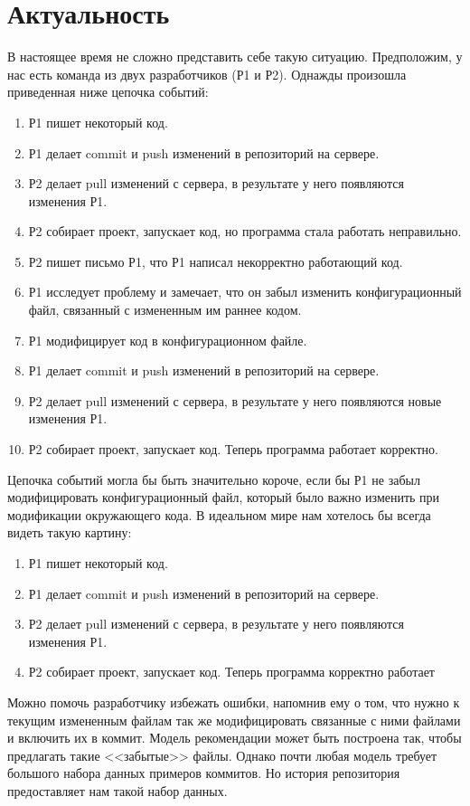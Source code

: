 \documentclass[times]{itmo-student-thesis}
\begin{document}
\section{Актуальность}
В настоящее время не сложно представить себе такую ситуацию. Предположим, у нас есть команда из двух разработчиков (Р1 и Р2). Однажды произошла приведенная ниже цепочка событий:
    \begin{enumerate}
		\item Р1 пишет некоторый код.
		\item Р1 делает commit и push изменений в репозиторий на сервере.
		\item Р2 делает pull изменений с сервера, в результате у него появляются изменения Р1.
		\item Р2 собирает проект, запускает код, но программа стала работать неправильно.
		\item Р2 пишет письмо Р1, что Р1 написал некорректно работающий код. 
		\item Р1 исследует проблему и замечает, что он забыл изменить конфигурационный файл, связанный с измененным им раннее кодом.
		\item Р1 модифицирует код в конфигурационном файле.
		\item Р1 делает commit и push изменений в репозиторий на сервере.
		\item Р2 делает pull изменений с сервера, в результате у него появляются новые изменения Р1.
		\item Р2 собирает проект, запускает код. Теперь программа работает корректно.
	\end{enumerate}
Цепочка событий могла бы быть значительно короче, если бы Р1 не забыл модифицировать конфигурационный файл, который было важно изменить при модификации окружающего кода. В идеальном мире нам хотелось бы всегда видеть такую картину:
    \begin{enumerate}
		\item Р1 пишет некоторый код.
		\item Р1 делает commit и push изменений в репозиторий на сервере.
		\item Р2 делает pull изменений с сервера, в результате у него появляются изменения Р1.
		\item Р2 собирает проект, запускает код. Теперь программа корректно работает
	\end{enumerate}
Можно помочь разработчику избежать ошибки, напомнив ему о том, что нужно к текущим измененным файлам так же модифицировать связанные с ними файлами и включить их в коммит. Модель рекомендации может быть построена так, чтобы предлагать такие <<забытые>> файлы. Однако почти любая модель требует большого набора данных примеров коммитов. Но история репозитория предоставляет нам такой набор данных.
\end{document}
